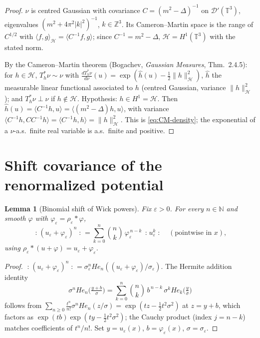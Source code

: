 \documentclass[12pt]{article}
\newcommand{\bT}{\mathbb{T}}
\newcommand{\bN}{\mathbb{N}}
\newcommand{\bZ}{\mathbb{Z}}
\newcommand{\cD}{\mathcal{D}}
\newcommand{\cH}{\mathcal{H}}
\newcommand{\eps}{\varepsilon}
\newcommand{\Wick}[1]{\mathopen{:}#1\mathclose{:}}
\theoremstyle{plain}
\newtheorem{lemma}{Lemma}
\theoremstyle{definition}
\begin{document}
\begin{proof}
$\nu$ is centred Gaussian with covariance $C=(m^2-\Delta)^{-1}$ on $\cD'(\bT^3)$,
eigenvalues $(m^2+4\pi^2|k|^2)^{-1}$, $k\in\bZ^3$. Its Cameron--Martin space is the
range of $C^{1/2}$ with $\langle f,g\rangle_\cH=\langle C^{-1}f,g\rangle$; since
$C^{-1}=m^2-\Delta$, $\cH=H^1(\bT^3)$ with the stated norm.

By the Cameron--Martin theorem (Bogachev, \emph{Gaussian Measures}, Thm.\ 2.4.5):
for $h\in\cH$, $T_h^*\nu\sim\nu$ with $\frac{dT_h^*\nu}{d\nu}(u)=\exp(\widehat h(u)
-\tfrac12\|h\|_\cH^2)$, $\widehat h$ the measurable linear functional associated to
$h$ (centred Gaussian, variance $\|h\|_\cH^2$); and $T_h^*\nu\perp\nu$ if $h\notin\cH$.
Hypothesis: $h\in H^1=\cH$. Then $\widehat h(u)=\langle C^{-1}h,u\rangle
=\langle(m^2-\Delta)h,u\rangle$, with variance $\langle C^{-1}h,CC^{-1}h\rangle
=\langle C^{-1}h,h\rangle=\|h\|_\cH^2$. This is \eqref{eq:CM-density}; the
exponential of a $\nu$-a.s.\ finite real variable is a.s.\ finite and positive.
\end{proof}

\section{Shift covariance of the renormalized potential}\label{sec:shift}

\begin{lemma}[Binomial shift of Wick powers]\label{lem:wick-shift}
Fix $\eps>0$. For every $n\in\bN$ and smooth $\varphi$ with $\varphi_\eps=\rho_\eps*\varphi$,
\begin{equation}\label{eq:wick-shift}
\Wick{(u_\eps+\varphi_\eps)^n}=\sum_{k=0}^n\binom{n}{k}\,\varphi_\eps^{\,n-k}\,
\Wick{u_\eps^k}\quad(\text{pointwise in }x),
\end{equation}
using $\rho_\eps*(u+\varphi)=u_\eps+\varphi_\eps$.
\end{lemma}

\begin{proof}
$\Wick{(u_\eps+\varphi_\eps)^n}=\sigma_\eps^n He_n((u_\eps+\varphi_\eps)/\sigma_\eps)$.
The Hermite addition identity
\begin{equation}\label{eq:hermite-add}
\sigma^n He_n\!\Big(\tfrac{y+b}{\sigma}\Big)
=\sum_{k=0}^n\binom{n}{k}\,b^{\,n-k}\,\sigma^k He_k\!\Big(\tfrac{y}{\sigma}\Big)
\end{equation}
follows from $\sum_{n\ge0}\frac{t^n}{n!}\sigma^n He_n(z/\sigma)=\exp(tz-\tfrac12t^2\sigma^2)$
at $z=y+b$, which factors as $\exp(tb)\exp(ty-\tfrac12t^2\sigma^2)$; the Cauchy
product (index $j=n-k$) matches coefficients of $t^n/n!$. Set $y=u_\eps(x)$,
$b=\varphi_\eps(x)$, $\sigma=\sigma_\eps$.
\end{proof}
\end{document}
